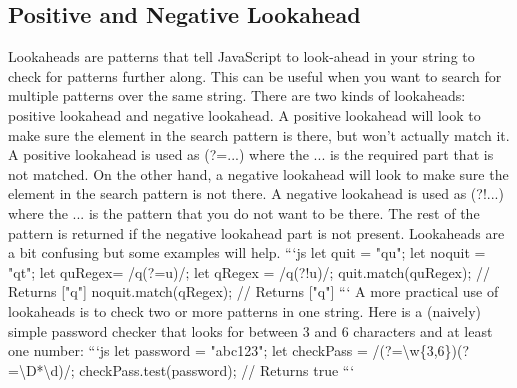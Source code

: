 \documentclass{article}%
\begin{document}
\subsection{Positive and Negative Lookahead}%
\label{subsec:PositiveandNegativeLookahead}%
Lookaheads are patterns that tell JavaScript to look{-}ahead in your string to check for patterns further along. This can be useful when you want to search for multiple patterns over the same string.\newline%
There are two kinds of lookaheads: positive lookahead and negative lookahead.\newline%
A positive lookahead will look to make sure the element in the search pattern is there, but won't actually match it. A positive lookahead is used as (?=...) where the ... is the required part that is not matched.\newline%
On the other hand, a negative lookahead will look to make sure the element in the search pattern is not there. A negative lookahead is used as (?!...) where the ... is the pattern that you do not want to be there. The rest of the pattern is returned if the negative lookahead part is not present.\newline%
Lookaheads are a bit confusing but some examples will help.\newline%
```js\newline%
let quit = "qu";\newline%
let noquit = "qt";\newline%
let quRegex= /q(?=u)/;\newline%
let qRegex = /q(?!u)/;\newline%
quit.match(quRegex); // Returns {[}"q"{]}\newline%
noquit.match(qRegex); // Returns {[}"q"{]}\newline%
```\newline%
A more practical use of lookaheads is to check two or more patterns in one string. Here is a (naively) simple password checker that looks for between 3 and 6 characters and at least one number:\newline%
```js\newline%
let password = "abc123";\newline%
let checkPass = /(?=\textbackslash{}w\{3,6\})(?=\textbackslash{}D*\textbackslash{}d)/;\newline%
checkPass.test(password); // Returns true\newline%
```\newline%
\end{document}
